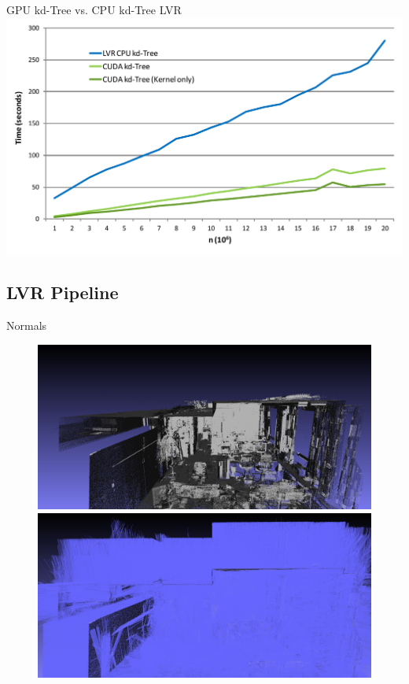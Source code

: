 \documentclass{beamer}
\begin{document}
\begin{frame}{GPU kd-Tree vs. CPU kd-Tree LVR}
	\includegraphics[width=1.0\textwidth]{plot_2.pdf}
\end{frame}

\subsection*{LVR Pipeline}

\begin{frame}{Normals}
 	\begin{figure}
  		\centering
  		\includegraphics[height=0.39\textheight]{police_no_normals.png}\\
  		\vspace{0.1cm}
  		\includegraphics[height=0.39\textheight]{police_normals.png}
	\end{figure}
\end{frame}
\end{document}
